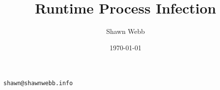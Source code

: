 \documentclass[twocolumn]{article}
\begin{document}
\title{Runtime Process Infection}
\author{Shawn Webb}
\texttt{shawn@shawnwebb.info}
\date{\today}
\maketitle

\begin{abstract}

\end{abstract}
\end{document}
